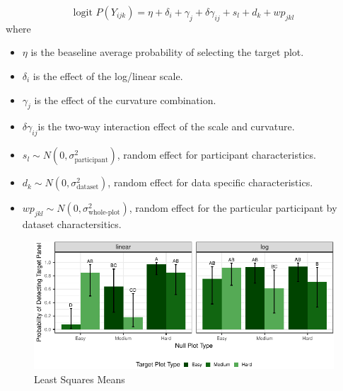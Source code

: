 \begin{appendix}
\begin{equation}
\text{logit }P(Y_{ijk}) = \eta + \delta_i + \gamma_j + \delta \gamma_{ij} + s_l + d_k + wp_{jkl}
\end{equation} where

\begin{itemize}
\item $\eta$ is the beaseline average probability of selecting the target plot. 
\item $\delta_i$ is the effect of the log/linear scale.
\item $\gamma_j$ is the effect of the curvature combination.
\item $\delta\gamma_{ij}$is the two-way interaction effect of the scale and curvature.
\item $s_l \sim N(0,\sigma^2_\text{{participant}})$, random effect for participant characteristics.
\item $d_k \sim N(0,\sigma^2_{\text{dataset}})$, random effect for data specific characteristics.
\item $wp_{jkl} \sim N(0,\sigma^2_\text{{whole-plot}})$, random effect for the particular participant by dataset charactersitics.
\end{itemize}


\begin{figure}

{\centering \includegraphics[width=\columnwidth]{./images/lsmeans-plot-1} 

}

\caption{Least Squares Means}\label{fig:lsmeans-plot}
\end{figure}
\end{appendix}
